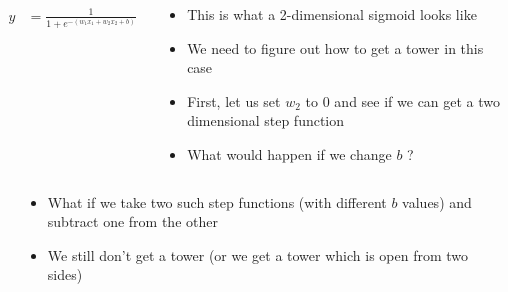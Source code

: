 \begin{frame}
	\begin{columns}
			\begin{overlayarea}{\textwidth}{\textheight}
					\begin{align*}
						y &= \frac{1}{1 + e^{-(w_1x_1 + w_2x_2 + b)}}
					\end{align*}
				\vspace{-0.3in}
				\begin{onlyenv}
			\end{onlyenv}



		\end{overlayarea}
		\begin{overlayarea}{\textwidth}{\textheight}
			\begin{itemize}\justifying
				\item This is what a 2-dimensional sigmoid looks like
				\item We need to figure out how to get a tower in this case
				\item First, let us set $w_2$ to 0 and see if we can get a two dimensional step function
				\item What would happen if we change $b$ ?
			\end{itemize}
		\end{overlayarea}
	\end{columns}
\end{frame}

\begin{frame}
	\begin{columns}
		\column{0.5\textwidth}
		\begin{overlayarea}{\textwidth}{\textheight}
			
		\end{overlayarea}
		\column{0.5\textwidth}
		\begin{overlayarea}{\textwidth}{\textheight}
			\begin{itemize}\justifying
				\item<1-> What if we take two such step functions (with different $b$ values) and subtract one from the other
				\item<4-> We still don't get a tower (or we get a tower which is open from two sides)
			\end{itemize}
		\end{overlayarea}
	\end{columns}
\end{frame}


